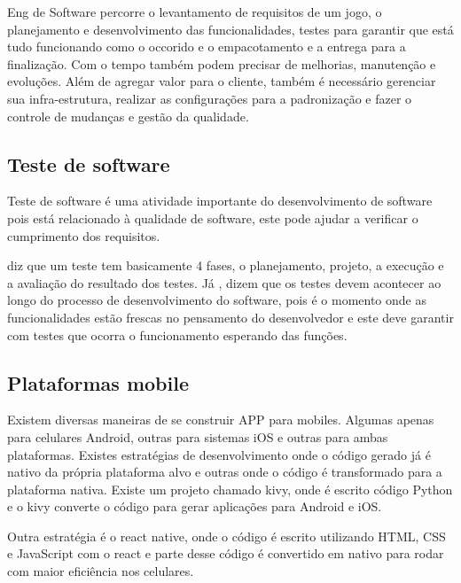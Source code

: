 Eng de Software percorre o levantamento de requisitos de um jogo, o planejamento e desenvolvimento das funcionalidades, testes para garantir que está tudo funcionando como o occorido e o empacotamento e a entrega para a finalização. Com o tempo também podem precisar de melhorias, manutenção e evoluções. Além de agregar valor para o cliente, também é necessário gerenciar sua infra-estrutura, realizar as configurações para a padronização e fazer o controle de mudanças e gestão da qualidade.

\subsection[Teste de software]{Teste de software}
Teste de software é uma atividade importante do desenvolvimento de software pois está relacionado à qualidade de software, este pode ajudar a verificar o cumprimento dos requisitos.

\cite[p. 17]{Pedro_Henrique} diz que um teste tem basicamente 4 fases, o planejamento, projeto, a execução e a avaliação do resultado dos testes. Já \cite{pressman}, \cite{delamaroJinoMaldonado} dizem que os testes devem acontecer ao longo do processo de desenvolvimento do software, pois é o momento onde as funcionalidades estão frescas no pensamento do desenvolvedor e este deve garantir com testes que ocorra o funcionamento esperando das funções.


\subsection[Plataformas mobile]{Plataformas mobile}
Existem diversas maneiras de se construir APP para mobiles. Algumas apenas para celulares Android, outras para sistemas iOS e outras para ambas plataformas. Existes estratégias de desenvolvimento onde o código gerado já é nativo da própria plataforma alvo e outras onde o código é transformado para a plataforma nativa.
Existe um  projeto chamado kivy, onde é escrito código Python e o kivy converte o código para gerar aplicações para Android e iOS.

Outra estratégia é o react native, onde o código é escrito utilizando HTML, CSS e JavaScript com o react e parte desse código é convertido em nativo para rodar com maior eficiência nos celulares.
